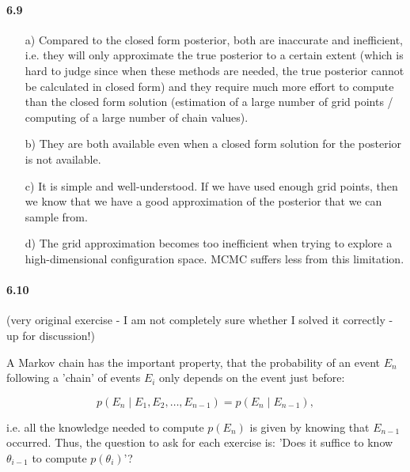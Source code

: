 \documentclass[fontsize=11pt,DIV=18,parskip=half]{scrartcl}
\begin{document}
\paragraph{6.9}
\begin{enumerate}
\item[a)] Compared to the closed form posterior, both are inaccurate and inefficient, i.e. they will only approximate the true posterior to a certain extent (which is hard to judge since when these methods are needed, the true posterior cannot be calculated in closed form) and they require much more effort to compute than the closed form solution (estimation of a large number of grid points / computing of a large number of chain values).
\item[b)] They are both available even when a closed form solution for the posterior is not available.
\item[c)] It is simple and well-understood. If we have used enough grid points, then we know that we have a good approximation of the posterior that we can sample from.
\item[d)] The grid approximation becomes too inefficient when trying to explore a high-dimensional configuration space. MCMC suffers less from this limitation.
\end{enumerate}

\paragraph{6.10} (very original exercise - I am not completely sure whether I solved it correctly - up for discussion!)

A Markov chain has the important property, that the probability of an event $E_n$ following a 'chain' of events $E_i$ only depends on the event just before:

\begin{equation*}
p(E_n \; | \; E_1, E_2, \dots, E_{n-1}) = p(E_n \; | \; E_{n-1}),
\end{equation*}

i.e. all the knowledge needed to compute $p(E_n)$ is given by knowing that $E_{n-1}$ occurred. Thus, the question to ask for each exercise is: 'Does it suffice to know $\theta_{i-1}$ to compute $p(\theta_i)$'?
\end{document}
